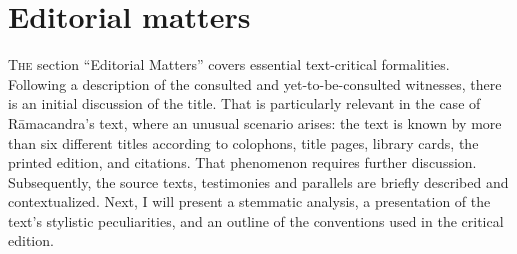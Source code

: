 \section{Editorial matters}

\lettrine[lines=2, lhang=0.2, loversize=0.25]{T}{he} section ``Editorial Matters'' covers essential text-critical formalities. Following a description of the consulted and yet-to-be-consulted witnesses, there is an initial discussion of the title. That is particularly relevant in the case of Rāmacandra's text, where an unusual scenario arises: the text is known by more than six different titles according to colophons, title pages, library cards, the printed edition, and citations. That phenomenon requires further discussion. Subsequently, the source texts, testimonies and parallels are briefly described and contextualized. Next, I will present a stemmatic analysis, a presentation of the text's stylistic peculiarities, and an outline of the conventions used in the critical edition.

